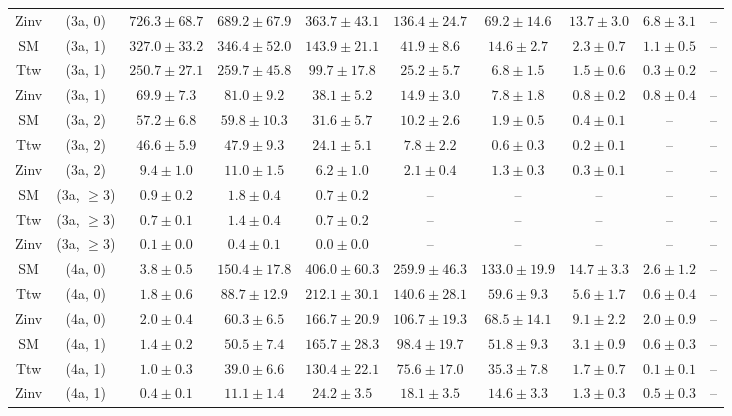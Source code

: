 \begin{table}[h!]
{\begin{tabular}{cccccccccc}
	Zinv & (3a, 0) & $726.3\pm 68.7$ & $689.2\pm 67.9$ & $363.7\pm 43.1$ & $136.4\pm 24.7$ & $69.2\pm 14.6$ & $13.7\pm 3.0$ & $6.8\pm 3.1$ & -- \\[0.5ex] 
	SM & (3a, 1) & $327.0\pm 33.2$ & $346.4\pm 52.0$ & $143.9\pm 21.1$ & $41.9\pm 8.6$ & $14.6\pm 2.7$ & $2.3\pm 0.7$ & $1.1\pm 0.5$ & -- \\[0.5ex] 
	Ttw & (3a, 1) & $250.7\pm 27.1$ & $259.7\pm 45.8$ & $99.7\pm 17.8$ & $25.2\pm 5.7$ & $6.8\pm 1.5$ & $1.5\pm 0.6$ & $0.3\pm 0.2$ & -- \\[0.5ex] 
	Zinv & (3a, 1) & $69.9\pm 7.3$ & $81.0\pm 9.2$ & $38.1\pm 5.2$ & $14.9\pm 3.0$ & $7.8\pm 1.8$ & $0.8\pm 0.2$ & $0.8\pm 0.4$ & -- \\[0.5ex] 
	SM & (3a, 2) & $57.2\pm 6.8$ & $59.8\pm 10.3$ & $31.6\pm 5.7$ & $10.2\pm 2.6$ & $1.9\pm 0.5$ & $0.4\pm 0.1$ & -- & -- \\[0.5ex] 
	Ttw & (3a, 2) & $46.6\pm 5.9$ & $47.9\pm 9.3$ & $24.1\pm 5.1$ & $7.8\pm 2.2$ & $0.6\pm 0.3$ & $0.2\pm 0.1$ & -- & -- \\[0.5ex] 
	Zinv & (3a, 2) & $9.4\pm 1.0$ & $11.0\pm 1.5$ & $6.2\pm 1.0$ & $2.1\pm 0.4$ & $1.3\pm 0.3$ & $0.3\pm 0.1$ & -- & -- \\[0.5ex] 
	SM & (3a, $\ge3$) & $0.9\pm 0.2$ & $1.8\pm 0.4$ & $0.7\pm 0.2$ & -- & -- & -- & -- & -- \\[0.5ex] 
	Ttw & (3a, $\ge3$) & $0.7\pm 0.1$ & $1.4\pm 0.4$ & $0.7\pm 0.2$ & -- & -- & -- & -- & -- \\[0.5ex] 
	Zinv & (3a, $\ge3$) & $0.1\pm 0.0$ & $0.4\pm 0.1$ & $0.0\pm 0.0$ & -- & -- & -- & -- & -- \\[0.5ex] 
	SM & (4a, 0) & $3.8\pm 0.5$ & $150.4\pm 17.8$ & $406.0\pm 60.3$ & $259.9\pm 46.3$ & $133.0\pm 19.9$ & $14.7\pm 3.3$ & $2.6\pm 1.2$ & -- \\[0.5ex] 
	Ttw & (4a, 0) & $1.8\pm 0.6$ & $88.7\pm 12.9$ & $212.1\pm 30.1$ & $140.6\pm 28.1$ & $59.6\pm 9.3$ & $5.6\pm 1.7$ & $0.6\pm 0.4$ & -- \\[0.5ex] 
	Zinv & (4a, 0) & $2.0\pm 0.4$ & $60.3\pm 6.5$ & $166.7\pm 20.9$ & $106.7\pm 19.3$ & $68.5\pm 14.1$ & $9.1\pm 2.2$ & $2.0\pm 0.9$ & -- \\[0.5ex] 
	SM & (4a, 1) & $1.4\pm 0.2$ & $50.5\pm 7.4$ & $165.7\pm 28.3$ & $98.4\pm 19.7$ & $51.8\pm 9.3$ & $3.1\pm 0.9$ & $0.6\pm 0.3$ & -- \\[0.5ex] 
	Ttw & (4a, 1) & $1.0\pm 0.3$ & $39.0\pm 6.6$ & $130.4\pm 22.1$ & $75.6\pm 17.0$ & $35.3\pm 7.8$ & $1.7\pm 0.7$ & $0.1\pm 0.1$ & -- \\[0.5ex] 
	Zinv & (4a, 1) & $0.4\pm 0.1$ & $11.1\pm 1.4$ & $24.2\pm 3.5$ & $18.1\pm 3.5$ & $14.6\pm 3.3$ & $1.3\pm 0.3$ & $0.5\pm 0.3$ & -- \\[0.5ex] 

\end{tabular}}
\end{table}
